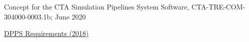\documentclass[short]{ctappp}
\begin{document}

\begin{thebibliography}{}

Concept for the CTA Simulation Pipelines System Software, 
CTA-TRE-COM-304000-0003.1b;
June 2020

%
%

\href{https://jama.cta-observatory.org/perspective.req#/containers/26376?projectId=11}{DPPS Requirements (2018)}

%
%
%
%

\end{thebibliography}



\normalsize
\printnoidxglossaries
\clearpage


%

\end{document}
